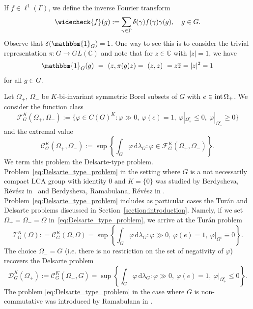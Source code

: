 \documentclass[[a4paper,english,12pt]{amsart}
\theoremstyle{plain}
\theoremstyle{remark}
\newcommand{\intt}{\mbox{\rm int\,}}
\begin{document}
If $f \in \ell^1(\Gamma)$, we define the inverse Fourier transform
$$
\widecheck{f}(g) := \sum_{\gamma \in \Gamma} \delta(\gamma)f(\gamma) \gamma(g), \quad g \in G.
$$
Observe that $\delta(\mathbbm{1}_G) = 1$. One way to see this is to consider the trivial representation \(\pi: G \to GL(\mathbb{C})\) and note that for \(z \in \mathbb{C}\) with \(|z|=1\), we have 
\begin{equation*}
  \mathbbm{1}_{G}(g) ~ = ~(z,\pi(g)z) = ~ (z,z) ~ = z\overline{z} = |z|^2 = 1  
\end{equation*}
for all \(g \in G\).  

Let $\Omega_+$, $\Omega_-$ be $K$-bi-invariant symmetric Borel subsets of $G$ with $e \in \intt{\Omega_+}$. We consider the function class
$$
\mathcal{F}^K_G(\Omega_+, \Omega_-) := \{ \varphi \in C(G)^{K} : \varphi  \gg 0, \ \varphi(e) = 1, \  \varphi|_{\Omega_+^c} \le 0, \  \varphi|_{\Omega_-^c} \ge 0 \}
$$
and the extremal value 
\begin{equation} \label{eq:Delsarte_type_problem}
\mathcal{C}^K_G(\Omega_+, \Omega_-) := \sup \left\{ \int_G \varphi \,\mbox{d}\lambda_G : \varphi \in \mathcal{F}^K_G(\Omega_+, \Omega_-) \right\}. 
\end{equation}
We term this problem the Delsarte-type problem. Problem~\eqref{eq:Delsarte_type_problem} in the setting where $G$ is a not necessarily compact LCA group with identity $0$ and $K =\{0\}$ was studied by Berdysheva, R\'ev\'esz  in~\cite{Berdysheva} and Berdysheva, Ramabulana, R\'ev\'esz in \cite{BRR_Expo}. 
Problem~\eqref{eq:Delsarte_type_problem} includes as particular cases the Tur\'an and Delsarte problems discussed in Section~\ref{section:introduction}. Namely,
if we set $\Omega_+ = \Omega_- = \Omega$ in~\eqref{eq:Delsarte_type_problem}, we arrive at the Tur\'an problem
$$
\mathcal{T}^K_G(\Omega)  : = \mathcal{C}^K_G(\Omega, \Omega) = \sup \left\{ \int_G \varphi \,\mbox{d}\lambda_G : 
 \varphi  \gg 0, \ \varphi(e) = 1, \  \varphi|_{\Omega^c} \equiv 0 \right\}. 
$$
The choice $\Omega_- = G$ (i.e. there is no restriction on the set of negativity of $\varphi$) recovers the Delsarte problem
$$
\mathcal{D}^K_G(\Omega_+)  := \mathcal{C}^K_G(\Omega_+, G) = \sup \left\{ \int_G \varphi \,\mbox{d}\lambda_G :
\varphi  \gg 0, \ \varphi(e) = 1, \  \varphi|_{\Omega_+^c} \le 0 \right\}. 
$$
The problem \eqref{eq:Delsarte_type_problem} in the case where $G$ is non-commutative was introduced by Ramabulana in \cite{ramabulana}. 
\end{document}
